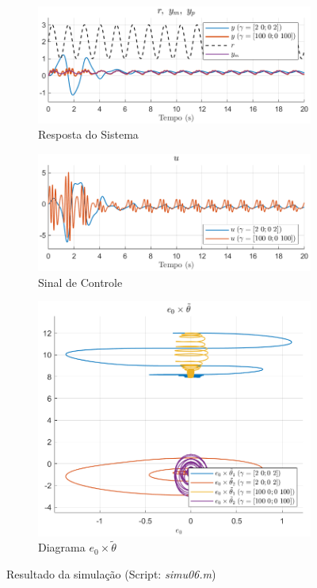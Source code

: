 \documentclass[10pt]{article}
\begin{document}
\begin{figure}[h!]
    \begin{subfigure}[b]{0.3\textwidth}
        \centering
        \includegraphics[width=\textwidth]{img/fig06c.png}
        \caption{Resposta do Sistema}
    \end{subfigure}
    \begin{subfigure}[b]{0.3\textwidth}
        \centering
        \includegraphics[width=\textwidth]{img/fig06e.png}
        \caption{Sinal de Controle}
    \end{subfigure}

    \begin{subfigure}[b]{0.3\textwidth}
        \centering
        \includegraphics[width=\textwidth]{img/fig06d.png}
        \caption{Diagrama $e_0 \times \tilde{\theta}$}
    \end{subfigure}

    \caption{Resultado da simulação (Script: \textit{simu06.m})}
    \label{fig:sim6}
\end{figure}
\end{document}
